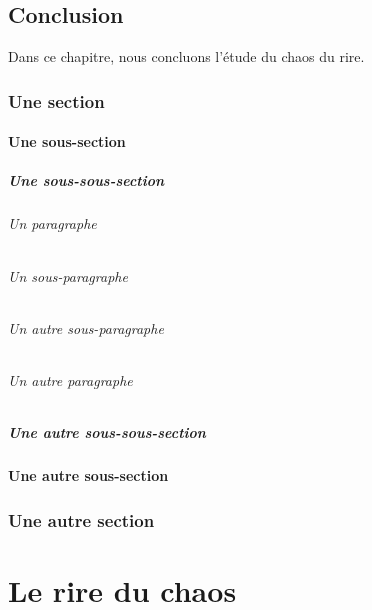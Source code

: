 \documentclass[12pt,space=onehalf,version=final]{yathesis}
\begin{document}
\chapter{Conclusion}
Dans ce chapitre, nous concluons l'étude du chaos du rire.

\lipsum[26-27]
\section{Une section}
\lipsum[28-29]
\subsection{Une sous-section}
\lipsum[29-31]
\subsubsection{Une sous-sous-section}
\lipsum[31-35]
\paragraph{Un paragraphe}
\lipsum[36-38]
\paragraph{Un sous-paragraphe}
\lipsum[39-41]
\paragraph{Un autre sous-paragraphe}
\lipsum[39-41]
\paragraph{Un autre paragraphe}
\lipsum[36-38]
\subsubsection{Une autre sous-sous-section}
\lipsum[31-35]
\subsection{Une autre sous-section}
\lipsum[29-31]
\section{Une autre section}
\lipsum[28-29]
%
%
\part{Le rire du chaos}
%
\end{document}
